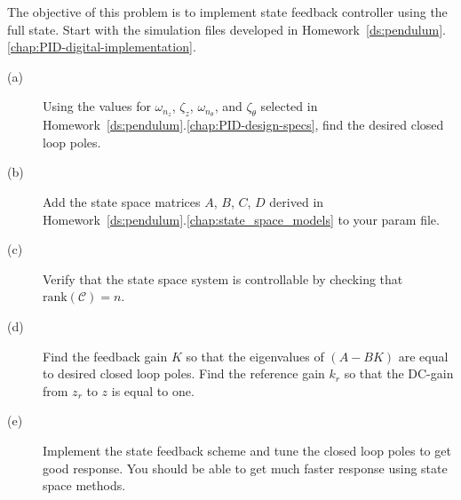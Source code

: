 The objective of this problem is to implement state feedback controller using the full state.
Start with the simulation files developed in Homework~\ref{ds:pendulum}.\ref{chap:PID-digital-implementation}.
\begin{description}
\item[(a)] Using the values for $\omega_{n_z}$, $\zeta_z$, $\omega_{n_{\theta}}$, and $\zeta_{\theta}$ selected in Homework~\ref{ds:pendulum}.\ref{chap:PID-design-specs}, find the desired closed loop poles.  
\item[(b)] Add the state space matrices $A$, $B$, $C$, $D$ derived in Homework~\ref{ds:pendulum}.\ref{chap:state_space_models} to your param file.
\item[(c)] Verify that the state space system is controllable by checking that $\text{rank}(\mathcal{C})=n$.
\item[(d)] Find the feedback gain $K$ so that the eigenvalues of $(A-BK)$ are equal to desired closed loop poles.  Find the reference gain $k_r$ so that the DC-gain from $z_r$ to $z$ is equal to one.  
\item[(e)] Implement the state feedback scheme and tune the closed loop poles to get good response.  You should be able to get much faster response using state space methods.
\end{description}

